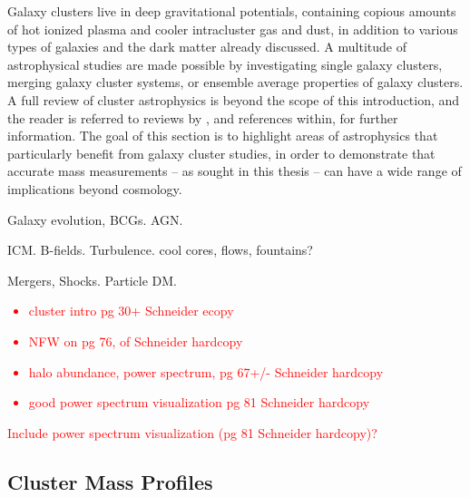 Galaxy clusters live in deep gravitational potentials, containing copious amounts of hot ionized plasma and cooler intracluster gas and dust, in addition to various types of galaxies and the dark matter already discussed. A multitude of astrophysical studies are made possible by investigating single galaxy clusters, merging galaxy cluster systems, or ensemble average properties of galaxy clusters. A full review of cluster astrophysics is beyond the scope of this introduction, and the reader is referred to reviews by \citet{Kravtsov12,Voit05}, and references within, for further information. The goal of this section is to highlight areas of astrophysics that particularly benefit from galaxy cluster studies, in order to demonstrate that accurate mass measurements -- as sought in this thesis -- can have a wide range of implications beyond cosmology.

Galaxy evolution, BCGs. AGN.

ICM. B-fields. Turbulence. cool cores, flows, fountains?

Mergers, Shocks. Particle DM. 


\textcolor{red}{\begin{itemize}\item cluster intro pg 30+ Schneider ecopy \item NFW on pg 76, of Schneider hardcopy \item halo abundance, power spectrum, pg 67+/- Schneider hardcopy \item good power spectrum visualization pg 81 Schneider hardcopy \end{itemize}}
\textcolor{red}{Include power spectrum visualization (pg 81 Schneider hardcopy)?}

\subsection{Cluster Mass Profiles}
\label{sec:Profiles}


